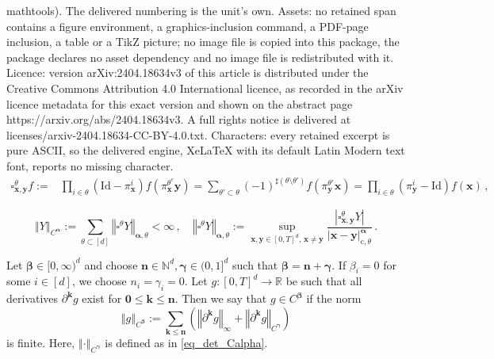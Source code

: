 \documentclass[10pt,a4paper]{amsart}
\def\bN{\mathbb{N}}
\def\bR{\mathbb{R}}\def\bS{\mathbb{S}}
\def\falpha{{\boldsymbol\alpha}}
\def\fbeta{{\boldsymbol\beta}}
\def\fgamma{{\boldsymbol\gamma}}
\def\fk{\mathbf k}\def\fl{\mathbf l}
\def\fl{\mathbf l}
\def\fn{\mathbf n}\def\fN{\mathbf N}
\def\foo{{\boldsymbol 0}}
\def\fx{\mathbf x}
\def\fy{\mathbf y}\def\fz{\mathbf z}
\def\fz{\mathbf z}
\newcommand{\Id}{\mbox{Id}}
\newcommand{\norm}[1]{\left\Vert #1\right\Vert}
\begin{document}
mathtools). The delivered numbering is the unit's own. Assets: no retained span contains a figure environment, a graphics-inclusion command, a PDF-page inclusion, a table or a TikZ picture; no image file is copied into this package, the package declares no asset dependency and no image file is redistributed with it. Licence: version arXiv:2404.18634v3 of this article is distributed under the Creative Commons Attribution 4.0 International licence, as recorded in the arXiv licence metadata for this exact version and shown on the abstract page https://arxiv.org/abs/2404.18634v3. A full rights notice is delivered at licenses/arxiv-2404.18634-CC-BY-4.0.txt. Characters: every retained excerpt is pure ASCII, so the delivered engine, XeLaTeX with its default Latin Modern text font, reports no missing character.
\begin{align}\label{rectangular_increment}
\square_{\fx,\fy}^\theta f :=&\prod_{i\in\theta}(\text{Id} - \pi^i_{\fx})f(\pi^{\theta^c}_{\fx}\fy) = \sum_{\theta'\subset\theta} (-1)^{\sharp(\theta\setminus\theta')} f(\pi^{\theta'}_{\fy}\fx)
= \prod_{i\in\theta}(\pi^i_\fy - \Id)f(\fx)\,, 
\end{align}

\begin{equation}\label{eq_det_Calpha}
\norm{Y}_{C^\falpha} := \sum_{\theta\subset[d]} \norm{\square^\theta Y}_{\falpha,\theta} <\infty\,,\quad  \norm{\square^\theta Y}_{\falpha,\theta}:=\sup_{\fx, \fy\in [0,T]^d,\, \fx\neq \fy} \frac{|\square^\theta_{\fx,\fy} Y|}{|\fx- \fy|^{\falpha}_{\text{c}, \theta}}\,.
\end{equation}

\begin{definition}\label{def:Calpha}
    Let $\fbeta\in[0,\infty)^d$ and choose $\fn\in\bN^d, \fgamma\in(0,1]^d$ such that $\fbeta = \fn+\fgamma$. If $\beta_i = 0$ for some $i\in[d]$, we choose $n_i = \gamma_i= 0$. Let $g:[0,T]^d\to \bR$ be such that all derivatives $\partial^\fk g$ exist for $\foo\le\fk\le\fn$. Then we say that $g\in C^\fbeta$ if the norm
    \[
        \norm{g}_{C^\fbeta} := \sum_{\fk\le\fn} \left(\norm{\partial^\fk g}_\infty + \norm{\partial^{\fk} g}_{C^\fgamma}\right)
    \]
    is finite. Here, $\norm{\cdot}_{C^\fgamma}$ is defined as in \eqref{eq_det_Calpha}.
\end{definition}
\end{document}
